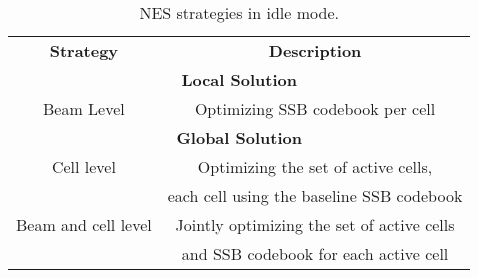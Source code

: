 \begin{table}[]
\begin{center}
\vspace{10pt}
\begin{tabular}{|c|c|}
\cline{1-2} 
\textbf{Strategy}        & \textbf{Description}      \\ \cline{1-2} 
  \multicolumn{2}{|c|}{\textbf{Local Solution}}                \\ \cline{1-2}  
Beam Level          & Optimizing SSB codebook per cell \\
\cline{1-2} 
  \multicolumn{2}{|c|}{\textbf{Global Solution}}                \\ \cline{1-2}  
Cell level &   Optimizing the set of active  
  cells, \\
  & each cell using the baseline SSB codebook \\
\cline{1-2}
 Beam and cell level   &   Jointly optimizing the set of active cells    \\
&  and SSB codebook for each active cell  \\
\cline{1-2}
\end{tabular}
\vspace{5pt}
\caption{NES strategies in idle mode.}
\label{tab:nes_strat}
\end{center}
\vspace{-25pt}
\end{table}

